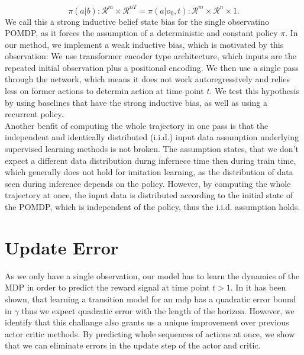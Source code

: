 \begin{equation}
    \pi(a|b) : \mathcal{R}^m \times \mathcal{R}^{n T} = \pi(a|o_0, t): \mathcal{R}^m \times \mathcal{R}^{n} \times 1.
\end{equation}
We call this a strong inductive belief state bias for the single observatino POMDP, as it forces the assumption of a deterministic and constant policy $\pi$. 
In our method, we implement a weak inductive bias, which is motivated by this observation: We use transformer encoder type architecture, which inputs are 
the repeated initial observation plus a positional encoding. We then use a single pass through the network, which means it does not work autoregressively and 
relies less on former actions to determin action at time point $t$. We test this hypothesis by using baselines that have the strong inductive bias, as well as 
using a recurrent policy.\\ 
Another benfit of computing the whole trajectory in one pass is that the independent and identically distributed (i.i.d.) input data 
assumption underlying supervised learning methods is not broken. The assumption states, that we don't expect a different data distribution durng infernece time 
then during train time, which generally does not hold for imitation learning, as the distribution of data seen during inference depends on the policy. 
However, by computing the whole trajectory at once, the input data is distributed according to the initial state of the POMDP, which is independent of 
the policy, thus the i.i.d. assumption holds.\\

\section{Update Error}
\label{inference_time_planning}
As we only have a single observation, our model has to learn the dynamics of the MDP in order to predict the reward signal at time point $t > 1$. In \cite{NEURIPS2020_b5c01503} 
it has been shown, that learning a transition model for an mdp has a quadratic error bound in $\gamma$ thus we expect quadratic error with the length of the horizon. 
However, we identify that this challange also grants us a unique improvement over previous actor critic methods. By predicting whole sequences of actions at once, 
we show that we can eliminate errors in the update step of the actor and critic.\\

